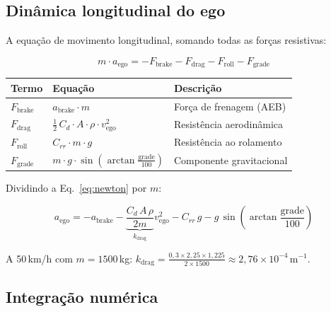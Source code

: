 \documentclass[12pt,a4paper]{article}
\begin{document}
\subsection{Dinâmica longitudinal do ego}

A equação de movimento longitudinal, somando todas as forças resistivas:

\begin{equation}
  m \cdot a_\text{ego} = -F_\text{brake} - F_\text{drag} - F_\text{roll} - F_\text{grade}
  \label{eq:newton}
\end{equation}

\begin{table}[H]
  \centering
  \begin{tabularx}{\linewidth}{llX}
    \toprule
    \rowcolor{azulescuro!90}
    \color{white}\textbf{Termo} & \color{white}\textbf{Equação} & \color{white}\textbf{Descrição} \\
    \midrule
    $F_\text{brake}$ & $a_\text{brake} \cdot m$ & Força de frenagem (AEB) \\
    \rowcolor{azulclaro!50}
    $F_\text{drag}$  & $\tfrac{1}{2}\,C_d \cdot A \cdot \rho \cdot v_\text{ego}^2$ & Resistência aerodinâmica \\
    $F_\text{roll}$  & $C_{rr} \cdot m \cdot g$ & Resistência ao rolamento \\
    \rowcolor{azulclaro!50}
    $F_\text{grade}$ & $m \cdot g \cdot \sin\!\left(\arctan\!\tfrac{\text{grade}}{100}\right)$ & Componente gravitacional \\
    \bottomrule
  \end{tabularx}
\end{table}

Dividindo a Eq.~\eqref{eq:newton} por $m$:

\begin{equation}
  a_\text{ego} = -a_\text{brake}
               - \underbrace{\frac{C_d\, A\, \rho}{2m}}_{k_\text{drag}} v_\text{ego}^2
               - C_{rr}\, g
               - g\,\sin\!\left(\arctan\frac{\text{grade}}{100}\right)
\end{equation}

A 50\,km/h com $m = 1500$\,kg: $k_\text{drag} = \frac{0{,}3 \times 2{,}25 \times 1{,}225}{2 \times 1500} \approx 2{,}76 \times 10^{-4}$\,m$^{-1}$.

\subsection{Integração numérica}
\end{document}
